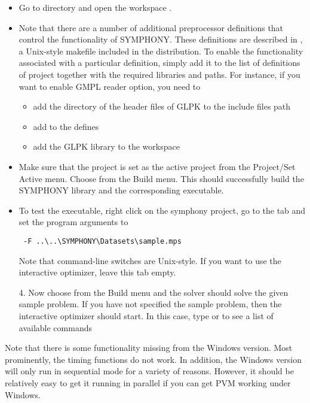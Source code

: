\begin{itemize}

\item Go to  directory and open the workspace 
. 

\item Note that there are a number of additional preprocessor definitions that
control the functionality of SYMPHONY. These definitions are described in
, a Unix-style makefile included in the distribution. To 
enable the functionality associated with a particular definition, simply add 
it to the list of definitions of  project together with 
the required libraries and paths. For instance, if you 
want to enable GMPL reader option, you need to
\begin{itemize}
  \item add the directory of the header files of GLPK to the include 
files path
  \item add  to the defines
  \item add the GLPK library to the workspace
\end{itemize}
\item Make sure that the project  is set as the active 
project from the Project/Set Active menu. Choose 
 from the Build menu. This should successfully 
build the SYMPHONY library and the corresponding executable.

\item To test the executable, right click on the symphony project, go to the
 tab and set the program arguments to 
{\color{Brown}
\begin{verbatim}
 -F ..\..\SYMPHONY\Datasets\sample.mps 
\end{verbatim}
}
Note that command-line switches are Unix-style. If you want to use the 
interactive optimizer, leave this tab empty. 

4. Now choose  from the Build menu and the solver should 
solve the given sample problem. If you have not specified the sample problem, 
then the interactive optimizer should start. In this case, 
type  or  to see a list of available commands
\end{itemize}

Note that there is some functionality missing from the Windows version. Most
prominently, the timing functions do not work. In addition, the Windows
version will only run in sequential mode for a variety of reasons. However, it
should be relatively easy to get it running in parallel if you can get PVM
working under Windows. 

